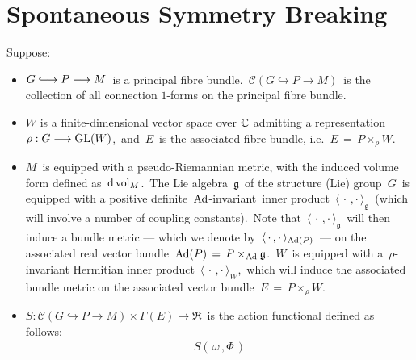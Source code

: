 

\section{Spontaneous Symmetry Breaking}
\setcounter{theorem}{0}
\setcounter{equation}{0}


\renewcommand{\theenumi}{\roman{enumi}}
\renewcommand{\labelenumi}{\textnormal{(\theenumi)}$\;\;$}


Suppose:
\begin{itemize}
\item
	$G \longhookrightarrow P \longrightarrow M$\,
	is a principal fibre bundle.
	\vskip 0.01cm
	\,$\mathscr{C}\!\left(G\hookrightarrow P \rightarrow M\right)$\,
	is the collection of all connection $1$-forms on the principal fibre bundle.
\item
	$W$ is a finite-dimensional vector space over $\mathbb{C}$ admitting a representation
	\,$\rho : G \longrightarrow \textnormal{GL}(W)$,\,
	and \,$E$\, is the associated fibre bundle, i.e.
	\,$E \,=\, P \times_{\rho} W$.\,
\item
	$M$\, is equipped with a pseudo-Riemannian metric,
	with the induced volume form defined as
	\,$\textnormal{d}\,\textnormal{vol}_{M}$.\,
	\vskip 0.1cm
	The Lie algebra \,$\mathfrak{g}$\, of the structure (Lie) group \,$G$\,
	is equipped with a positive definite \,$\textnormal{Ad}$-invariant\, inner product
	\,$\langle\,\cdot\,,\cdot\,\rangle_{\mathfrak{g}}$\,
	(which will involve a number of coupling constants).\,
	Note that
	\,$\langle\,\cdot\,,\cdot\,\rangle_{\mathfrak{g}}$\,
	will then induce a bundle metric
	--- which we denote by \,$\langle\,\cdot\,,\cdot\,\rangle_{\textnormal{Ad}(P)}$\, ---
	on the associated real vector bundle
	\,$\textnormal{Ad}(P) \,=\, P \times_{\textnormal{Ad}} \mathfrak{g}$.\,
	\vskip 0.1cm
	$W$\, is equipped with a \,$\rho$-invariant Hermitian inner product
	\,$\langle\,\cdot\,,\cdot\,\rangle_{W}$,\,
	which will induce the associated bundle metric on the associated vector bundle
	\,$E \,=\, P \times_{\rho} W $.\,
	\vskip 0.1cm
\item
	$S : \mathscr{C}\!\left(G\hookrightarrow P \rightarrow M\right) \times \Gamma(E) \longrightarrow \Re$\,
	is the action functional defined as follows:
	\begin{eqnarray*}
	S\!\left(\,\omega\,,\Phi\,\right)

\end{eqnarray*}
\end{itemize}
